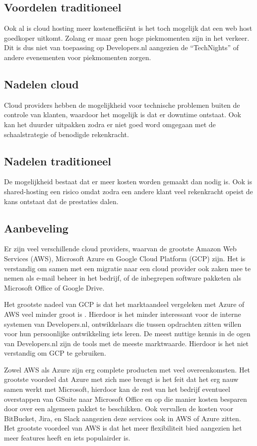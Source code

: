 \subsection{Voordelen traditioneel} 
Ook al is cloud hosting meer kostenefficiënt is het toch mogelijk dat een web host goedkoper uitkomt. Zolang er maar geen hoge piekmomenten zijn in het verkeer. Dit is dus niet van toepassing op Developers.nl aangezien de \enquote{TechNights} of andere evenementen voor piekmomenten zorgen. 

\subsection{Nadelen cloud}
Cloud providers hebben de mogelijkheid voor technische problemen buiten de controle van klanten, waardoor het mogelijk is dat er downtime ontstaat. Ook kan het duurder uitpakken zodra er niet goed word omgegaan met de schaalstrategie of benodigde rekenkracht.

\subsection{Nadelen traditioneel}
De mogelijkheid bestaat dat er meer kosten worden gemaakt dan nodig is. Ook is shared-hosting een risico omdat zodra een andere klant veel rekenkracht opeist de kans ontstaat dat de prestaties dalen.

\subsection{Aanbeveling}
Er zijn veel verschillende cloud providers, waarvan de grootste Amazon Web Services (AWS), Microsoft Azure en Google Cloud Platform (GCP) zijn. Het is verstandig om samen met een migratie naar een cloud provider ook zaken mee te nemen als e-mail beheer in het bedrijf, of de inbegrepen software pakketen als Microsoft Office of Google Drive.

Het grootste nadeel van GCP is dat het marktaandeel vergeleken met Azure of AWS veel minder groot is \parencite{MarketShare}. Hierdoor is het minder interessant voor de interne systemen van Developers.nl, ontwikkelaars die tussen opdrachten zitten willen voor hun persoonlijke ontwikkeling iets leren. De meest nuttige kennis in de ogen van Developers.nl zijn de tools met de meeste marktwaarde. Hierdoor is het niet verstandig om GCP te gebruiken.

Zowel AWS als Azure zijn erg complete producten met veel overeenkomsten. Het grootste voordeel dat Azure met zich mee brengt is het feit dat het erg nauw samen werkt met Microsoft, hierdoor kan de rest van het bedrijf eventueel overstappen van GSuite naar Microsoft Office en op die manier kosten besparen door over een algemeen pakket te beschikken. Ook vervallen de kosten voor BitBucket, Jira, en Slack aangezien deze services ook in AWS of Azure zitten. Het grootste voordeel van AWS is dat het meer flexibiliteit bied aangezien het meer features heeft en iets populairder is.


